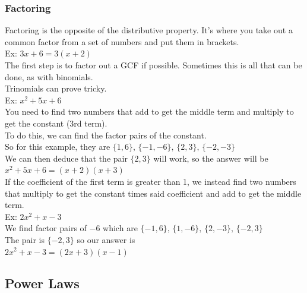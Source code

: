 \documentclass[11pt, fleqn]{article}
\begin{document}
\subsubsection{Factoring}
Factoring is the opposite of the distributive property. It's where you take out a common factor from a set of numbers and put them in brackets.\\
Ex: $3x+6=3(x+2)$\\
The first step is to factor out a GCF if possible. Sometimes this is all that can be done, as with binomials.\\
Trinomials can prove tricky.\\
Ex: $x^2+5x+6$\\
You need to find two numbers that add to get the middle term and multiply to get the constant (3rd term).\\
To do this, we can find the factor pairs of the constant.\\
So for this example, they are $\{1,6\},\,\{-1,-6\},\,\{2,3\},\,\{-2,-3\}$\\
We can then deduce that the pair $\{2,3\}$ will work, so the answer will be\\ ${x^2+5x+6=(x+2)(x+3)}$\\
If the coefficient of the first term is greater than 1, we instead find two numbers that multiply to get the constant times said coefficient and add to get the middle term.\\
Ex: $2x^2+x-3$\\
We find factor pairs of $-6$ which are $\{-1,6\},\,\{1,-6\},\,\{2,-3\},\,\{-2,3\}$\\
The pair is $\{-2,3\}$ so our answer is\\
$2x^2+x-3=(2x+3)(x-1)$







\subsection{Power Laws}
\end{document}
